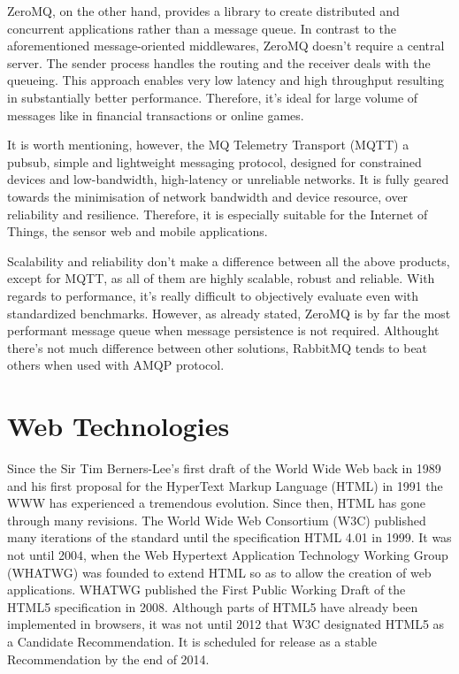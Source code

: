ZeroMQ, on the other hand, provides a library to create distributed and concurrent applications rather than a message queue. In contrast to the aforementioned message-oriented middlewares, ZeroMQ doesn't require a central server. The sender process handles the routing and the receiver deals with the queueing. This approach enables very low latency and high throughput resulting in substantially better performance. Therefore, it's ideal for large volume of messages like in financial transactions or online games.

It is worth mentioning, however, the MQ Telemetry Transport (MQTT) a pub\-sub, simple and lightweight messaging protocol, designed for constrained devices and low-bandwidth, high-latency or unreliable networks. It is fully geared towards the minimisation of network bandwidth and device resource, over reliability and resilience. Therefore, it is especially suitable for the Internet of Things, the sensor web and mobile applications.

Scalability and reliability don't make a difference between all the above products, except for MQTT, as all of them are highly scalable, robust and reliable. With regards to performance, it's really difficult to objectively evaluate even with standardized benchmarks. However, as already stated, ZeroMQ is by far the most performant message queue when message persistence is not required. Althought there's not much difference between other solutions, RabbitMQ tends to beat others when used with AMQP protocol.

\section{Web Technologies}

Since the Sir Tim Berners-Lee's first draft of the World Wide Web back in 1989 and his first proposal for the HyperText Markup Language (HTML) \cite{HTMLtags} in 1991 the WWW has experienced a tremendous evolution. Since then, HTML has gone through many revisions. The World Wide Web Consortium (W3C) published many iterations of the standard until the specification HTML 4.01 in 1999. It was not until 2004, when the Web Hypertext Application Technology Working Group (WHATWG) was founded to extend HTML so as to allow the creation of web applications. WHATWG published the First Public Working Draft of the HTML5 specification in 2008. Although parts of HTML5 have already been implemented in browsers, it was not until 2012 that W3C designated HTML5 as a Candidate Recommendation. It is scheduled for release as a stable Recommendation by the end of 2014.

